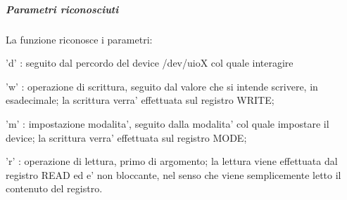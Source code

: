 \subparagraph*{Parametri riconosciuti}

La funzione riconosce i parametri\+:
\begin{DoxyItemize}
\item 'd' \+: seguito dal percordo del device /dev/uio\+X col quale interagire
\item 'w' \+: operazione di scrittura, seguito dal valore che si intende scrivere, in esadecimale; la scrittura verra' effettuata sul registro W\+R\+I\+T\+E;
\item 'm' \+: impostazione modalita', seguito dalla modalita' col quale impostare il device; la scrittura verra' effettuata sul registro M\+O\+D\+E;
\item 'r' \+: operazione di lettura, primo di argomento; la lettura viene effettuata dal registro R\+E\+A\+D ed e' non bloccante, nel senso che viene semplicemente letto il contenuto del registro.
\end{DoxyItemize}